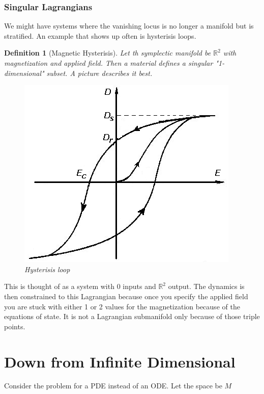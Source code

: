 \documentclass[a4paper,landscape]{article}
\theoremstyle{change}
\newtheorem{definition}[equation]{Definition}
\theoremstyle{nonumberplain}
\numberwithin{equation}{section}
\begin{document}
\subsubsection{Singular Lagrangians}

We might have systems where the vanishing locus is no longer a manifold but is stratified. An example that shows up often is hysterisis loops.

\begin{definition}[Magnetic Hysterisis]
Let th symplectic manifold be $\mathbb{R}^2$ with magnetization and applied field. Then a material defines a singular "1-dimensional" subset. A picture describes it best.

\begin{figure}[htb!]
\centering
\includegraphics[scale=.2]{Hysteresis.png}
\caption{Hysterisis loop}
\end{figure}

\end{definition}

This is thought of as a system with 0 inputs and $\mathbb{R}^2$ output. The dynamics is then constrained to this Lagrangian because once you specify the applied field you are stuck with either 1 or 2 values for the magnetization because of the equations of state. It is not a Lagrangian submanifold only because of those triple points.

\section{Down from Infinite Dimensional}

Consider the problem for a PDE instead of an ODE. Let the space be $M$
\end{document}
